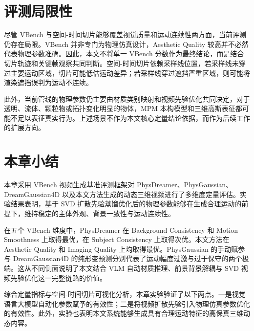 \section{评测局限性}

尽管 VBench 与空间-时间切片能够覆盖视觉质量和运动连续性两方面，当前评测仍存在局限。VBench 并非专门为物理仿真设计，Aesthetic Quality 较高并不必然代表物理参数准确。因此，本文不将单一 VBench 分数作为最终结论，而是结合切片轨迹和关键帧观察共同判断。空间-时间切片依赖采样线位置，若采样线未穿过主要运动区域，切片可能低估运动差异；若采样线穿过遮挡严重区域，则可能将渲染遮挡误判为运动不连续。

此外，当前管线的物理参数仍主要由材质类别映射和视频先验优化共同决定，对于透明、流体、颗粒物或拓扑变化明显的物体，MPM 本构模型和三维高斯表征都可能不足以表征真实行为。上述场景不作为本文核心定量结论依据，而作为后续工作的扩展方向。

\section{本章小结}

本章采用 VBench 视频生成基准评测框架对 PhysDreamer、PhysGaussian、DreamGaussian4D 以及本文方法生成的动态三维视频进行了多维度定量评估。实验结果表明，基于 SVD 扩散先验蒸馏优化后的物理参数能够在生成合理运动的前提下，维持稳定的主体外观、背景一致性与运动连续性。

在五个 VBench 维度中，PhysDreamer 在 Background Consistency 和 Motion Smoothness 上取得最优，在 Subject Consistency 上取得次优。本文方法在 Aesthetic Quality 和 Imaging Quality 上均取得最优。PhysGaussian 的手动赋参与 DreamGaussian4D 的纯形变预测分别代表了运动幅度过激与过于保守的两个极端。这从不同侧面说明了本文结合 VLM 自动材质推理、前景背景解耦与 SVD 视频先验优化这一完整链路的价值。

综合定量指标与空间-时间切片可视化分析，本章实验验证了以下两点。一是视觉语言大模型自动化参数赋予的有效性；二是将视频扩散先验引入物理仿真参数优化的有效性。此外，实验也表明本文系统能够生成具有合理运动特征的高保真三维动态内容。
